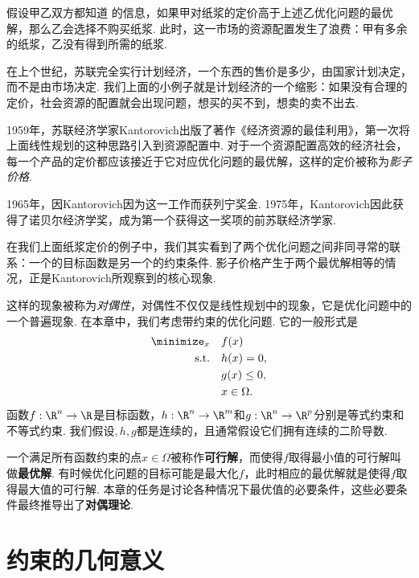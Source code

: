 假设甲乙双方都知道 的信息，如果甲对纸浆的定价高于上述乙优化问题的最优解，那么乙会选择不购买纸浆. 此时，这一市场的资源配置发生了浪费：甲有多余的纸浆，乙没有得到所需的纸浆.

在上个世纪，苏联完全实行计划经济，一个东西的售价是多少，由国家计划决定，而不是由市场决定. 我们上面的小例子就是计划经济的一个缩影：如果没有合理的定价，社会资源的配置就会出现问题，想买的买不到，想卖的卖不出去.

1959年，苏联经济学家Kantorovich出版了著作《经济资源的最佳利用》，第一次将上面线性规划的这种思路引入到资源配置中. 对于一个资源配置高效的经济社会，每一个产品的定价都应该接近于它对应优化问题的最优解，这样的定价被称为\emph{影子价格}. 

1965年，因Kantorovich因为这一工作而获列宁奖金. 1975年，Kantorovich因此获得了诺贝尔经济学奖，成为第一个获得这一奖项的前苏联经济学家. 

在我们上面纸浆定价的例子中，我们其实看到了两个优化问题之间非同寻常的联系：一个的目标函数是另一个的约束条件. 影子价格产生于两个最优解相等的情况，正是Kantorovich所观察到的核心现象. 

这样的现象被称为\emph{对偶性}，对偶性不仅仅是线性规划中的现象，它是优化问题中的一个普遍现象. 在本章中，我们考虑带约束的优化问题. 它的一般形式是
\begin{equation}
\begin{aligned}
    \minimize_x\quad& f(x) \\
    \text{s.t.}\quad& h(x)=0,\\
    & g(x)\leq 0, \\
    & x \in \Omega.
\end{aligned}\label{eq:general-constraint}    
\end{equation}
函数$f:\R^n\to \R$是目标函数，$h:\R^n\to \R^m$和$g:\R^n\to \R^p$分别是等式约束和不等式约束. 我们假设$
,h,g$都是连续的，且通常假设它们拥有连续的二阶导数.

一个满足所有函数约束的点$x\in\Omega$被称作\textbf{可行解}，而使得$f$取得最小值的可行解叫做\textbf{最优解}. 有时候优化问题的目标可能是最大化$f$，此时相应的最优解就是使得$f$取得最大值的可行解. 本章的任务是讨论各种情况下最优值的必要条件，这些必要条件最终推导出了\textbf{对偶理论}. 

\section{约束的几何意义}\label{sec:constraint-geometry}

